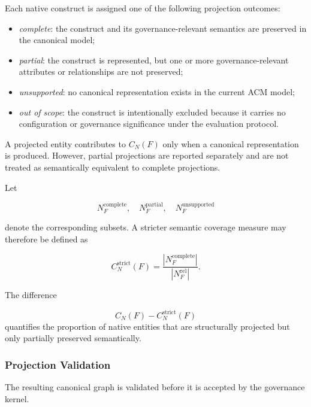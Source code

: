 \documentclass[10pt]{article}
\begin{document}
Each native construct is assigned one of the following projection outcomes:

\begin{itemize}
	\item \emph{complete}: the construct and its governance-relevant semantics
	are preserved in the canonical model;
	\item \emph{partial}: the construct is represented, but one or more
	governance-relevant attributes or relationships are not preserved;
	\item \emph{unsupported}: no canonical representation exists in the current
	ACM model;
	\item \emph{out of scope}: the construct is intentionally excluded because
	it carries no configuration or governance significance under the evaluation
	protocol.
\end{itemize}

A projected entity contributes to $C_N(F)$ only when a canonical representation
is produced. However, partial projections are reported separately and are not
treated as semantically equivalent to complete projections.

Let

\begin{equation}
	N_F^{\mathrm{complete}},
	\quad
	N_F^{\mathrm{partial}},
	\quad
	N_F^{\mathrm{unsupported}}
\end{equation}

denote the corresponding subsets. A stricter semantic coverage measure may
therefore be defined as

\begin{equation}
	C_N^{\mathrm{strict}}(F)
	=
	\frac{
		|N_F^{\mathrm{complete}}|
	}{
		|N_F^{\mathrm{rel}}|
	}.
\end{equation}

The difference

\begin{equation}
	C_N(F)-C_N^{\mathrm{strict}}(F)
\end{equation}
quantifies the proportion of native entities that are structurally projected
but only partially preserved semantically.

\subsubsection{Projection Validation}

The resulting canonical graph is validated before it is accepted by the
governance kernel.
\end{document}

